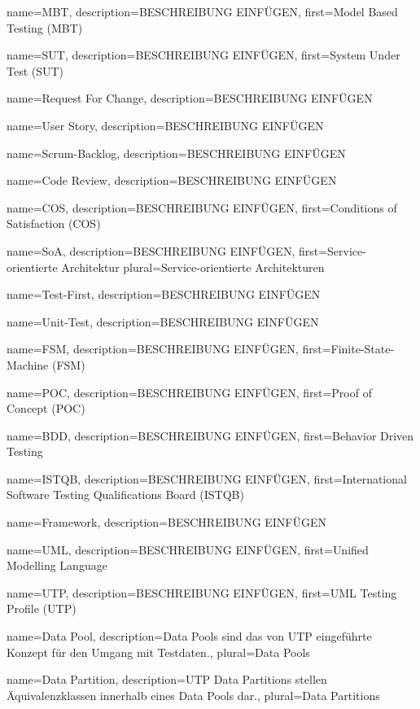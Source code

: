  {
	name={MBT},
	description={BESCHREIBUNG EINFÜGEN},
	first={Model Based Testing (MBT)}
}

 {
	name={SUT},
	description={BESCHREIBUNG EINFÜGEN},
	first={System Under Test (SUT)}
}

 {
	name={Request For Change},
	description={BESCHREIBUNG EINFÜGEN}
}

 {
	name={User Story},
	description={BESCHREIBUNG EINFÜGEN}
}

 {
	name={Scrum-Backlog},
	description={BESCHREIBUNG EINFÜGEN}
}

 {
	name={Code Review},
	description={BESCHREIBUNG EINFÜGEN}
}

 {
	name={COS},
	description={BESCHREIBUNG EINFÜGEN},
	first={Conditions of Satisfaction (COS)}
}

 {
	name={SoA},
	description={BESCHREIBUNG EINFÜGEN},
	first={Service-orientierte Architektur}
	plural={Service-orientierte Architekturen}
}

 {
	name={Test-First},
	description={BESCHREIBUNG EINFÜGEN}
}

 {
	name={Unit-Test},
	description={BESCHREIBUNG EINFÜGEN}
}

 {
	name={FSM},
	description={BESCHREIBUNG EINFÜGEN},
	first={Finite-State-Machine (FSM)}
}

 {
	name={POC},
	description={BESCHREIBUNG EINFÜGEN},
	first={Proof of Concept (POC)}
}

 {
	name={BDD},
	description={BESCHREIBUNG EINFÜGEN},
	first={Behavior Driven Testing}
}

 {
	name={ISTQB},
	description={BESCHREIBUNG EINFÜGEN},
	first={International Software Testing Qualifications Board (ISTQB)}
}

 {
	name={Framework},
	description={BESCHREIBUNG EINFÜGEN}
}

 {
	name={UML},
	description={BESCHREIBUNG EINFÜGEN},
	first={Unified Modelling Language}
}

 {
	name={UTP},
	description={BESCHREIBUNG EINFÜGEN},
	first={UML Testing Profile (UTP)}
}

 {
	name={Data Pool},
	description={Data Pools sind das von UTP eingeführte Konzept für den Umgang mit Testdaten.},
	plural={Data Pools}
}

 {
	name={Data Partition},
	description={UTP Data Partitions stellen Äquivalenzklassen innerhalb eines Data Pools dar.},
	plural={Data Partitions}
}